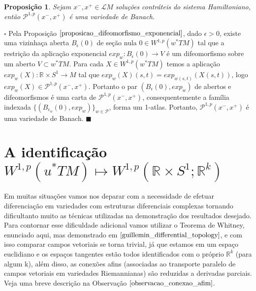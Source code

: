 \documentclass[12pt]{book}
\newtheorem{proposicao}[teorema]{Proposição}
\newenvironment{prova}[1]{$\square$ #1}{\hfill$\blacksquare$}
\newcommand{\aplicacaoexponencial}[2]{exp_{#1}(#2)}
\newcommand{\aplicacaoexponencialgeral}[1]{exp_{#1}}
\newcommand{\caminhosexponenciaisconectantesabrev}{\mathcal{P}}
\newcommand{\caminhosexponenciaisconectantes}[2]{\mathcal{P}^{1,p}(#1, #2)}
\newcommand{\caminhosexponenciaisconectantespadrao}{\caminhosexponenciaisconectantes{x^{-}}{x^{+}}}
\newcommand{\circulo}{S^{1}}
\newcommand{\espacosobolev}[1]{W^{1,p}(#1)}
\newcommand{\espacosobolevcontradominio}[2]{W^{1,p}(#1;#2)}
\newcommand{\pullbackfibradotangente}[2]{#1^{*}T#2}
\newcommand{\pullbackfibradotangenteM}[1]{\pullbackfibradotangente{#1}{M}}
\newcommand{\retacartesianocirculo}{\real{} \times \circulo}
\newcommand{\real}[1]{\mathbb{R}^{#1}}
\newcommand{\solucoesperiodicascontrateis}{\mathcal{L}M}
\begin{document}
	\begin{proposicao}\label{proposicao_variedade_banach}
		Sejam $x^{-}, x^{+} \in \solucoesperiodicascontrateis$ soluções contráteis do sistema Hamiltoniano, então $\caminhosexponenciaisconectantespadrao$ é uma variedade de Banach.
	\end{proposicao}
	\begin{prova}
		Pela Proposição $\ref{proposicao_difeomorfismo_exponencial}$, dado $\epsilon > 0$, existe uma vizinhaça aberta $B_{\epsilon}(0)$ de seção nula $0 \in \espacosobolev{\pullbackfibradotangenteM{w}}$ tal que a restrição da aplicação exponencial $\aplicacaoexponencialgeral{w}:B_{\epsilon}(0) \to V$ é um difeomorfismo sobre um aberto $V \subset \pullbackfibradotangenteM{w}$. Para cada $X \in \espacosobolev{\pullbackfibradotangenteM{w}}$ temos a aplicação $\aplicacaoexponencial{w}{X}:\retacartesianocirculo \to M$ tal que $\aplicacaoexponencial{w}{X}(s,t) = \aplicacaoexponencial{w(s,t)}{X(s,t)}$, logo $\aplicacaoexponencial{w}{X} \in \caminhosexponenciaisconectantespadrao$. Portanto o par $(B_{\epsilon}(0), \aplicacaoexponencialgeral{w})$ de abertos e difeomorfismos é uma carta de $\caminhosexponenciaisconectantespadrao$, consequentemente a família indexada $\{(B_{\epsilon_{w}}(0), \aplicacaoexponencialgeral{w})\}_{w \in \caminhosexponenciaisconectantesabrev}$, forma um 1-atlas. Portanto, $\caminhosexponenciaisconectantespadrao$ é uma variedade de Banach.
	\end{prova}
	
	\section{A identificação  $\espacosobolev{\pullbackfibradotangenteM{u}} \mapsto \espacosobolevcontradominio{\retacartesianocirculo}{\real{k}}$}\label{secao_identificacao_pullback_fibrado}
	Em muitas situações  vamos nos deparar com a necessidade de efetuar diferenciação em variedades com estruturas diferenciais complexas tornando dificultanto muito as técnicas utilizadas na demonstração dos resultados desejado. Para contornar esse dificuldade adicional vamos utilizar o Teorema de Whitney, enunciado aqui, mas demonstrado em $\cite{guillemin_differential_topology}$, e com isso comparar campos vetoriais se torna trivial, já que estamos em um espaço euclidiano e os espaços tangentes estão todos identificados com o próprio $\real{k}$ (para algum k), além disso, as conexões afins (associadas ao transporte paralelo de campos vetoriais em variedades Riemannianas) são reduzidas a derivadas parciais. Veja uma breve descrição na Observação $\ref{observacao_conexao_afim}$.
	
\end{document}

